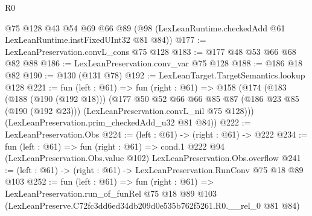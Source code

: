 \begin{lexlean}{R0}
\begin{coremodule}
    @75
    @128
    @43
    @54
    @69
    @66
    @89
    (@98 (LexLeanRuntime.checkedAdd @61 LexLeanRuntime.instFixedUInt32 @81 @84))
@177 := LexLeanPreservation.convL_cons @75 @128
@183 := @177 @48 @53 @66 @68 @82 @88
@186 := LexLeanPreservation.conv_var @75 @128
@188 := @186 @18 @82
@190 := @130 (@131 @78)
@192 := LexLeanTarget.TargetSemantics.lookup @128
@221 := fun (left : @61) =>
  fun (right : @61) =>
  @158
    (@174
      (@183
        (@188 (@190 (@192 @18)))
        (@177
          @50
          @52
          @66
          @66
          @85
          @87
          (@186 @23 @85 (@190 (@192 @23)))
          (LexLeanPreservation.convL_nil @75 @128)))
      (LexLeanPreservation.prim_checkedAdd_u32 @81 @84))
@222 := LexLeanPreservation.Obs
@224 := (left : @61) -> (right : @61) -> @222
@234 := fun (left : @61) =>
  fun (right : @61) =>
  cond.{1} @222 @94 (LexLeanPreservation.Obs.value @102) LexLeanPreservation.Obs.overflow
@241 := (left : @61) -> (right : @61) -> LexLeanPreservation.RunConv @75 @18 @89 @103
@252 := fun (left : @61) =>
  fun (right : @61) =>
  LexLeanPreservation.run_of_funRel
    @75
    @18
    @89
    @103
    (LexLeanPreserve.C72fc3dd6ed34db209d0e535b762f5261.R0.__rel_0 @81 @84)
\end{coremodule}
\end{lexlean}
